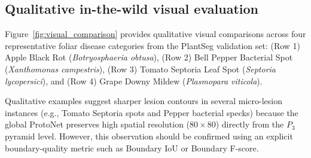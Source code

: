 \documentclass[5p,times]{elsarticle}
\begin{document}
\begin{table}[t]
\centering
\caption{Comprehensive quantitative benchmark across architectural tiers evaluated on the PlantSeg dataset (115 disease classes, 116 detector outputs). Latency and FPS measured on NVIDIA RTX 3070 Ti GPU ($640 \times 640$) and multi-core edge CPU ($320 \times 320$). Accuracy metrics measured on the unseen test partition ($N=2,295$ images, 15,569 lesion annotations) using pycocotools.}
\label{tab:hardware_benchmark}
\end{table}

\subsection{Qualitative in-the-wild visual evaluation}
Figure~\ref{fig:visual_comparison} provides qualitative visual comparisons across four representative foliar disease categories from the PlantSeg validation set: (Row 1) Apple Black Rot (\textit{Botryosphaeria obtusa}), (Row 2) Bell Pepper Bacterial Spot (\textit{Xanthomonas campestris}), (Row 3) Tomato Septoria Leaf Spot (\textit{Septoria lycopersici}), and (Row 4) Grape Downy Mildew (\textit{Plasmopara viticola}).

Qualitative examples suggest sharper lesion contours in several micro-lesion instances (e.g., Tomato Septoria spots and Pepper bacterial specks) because the global ProtoNet preserves high spatial resolution ($80 \times 80$) directly from the $P_3$ pyramid level. However, this observation should be confirmed using an explicit boundary-quality metric such as Boundary IoU or Boundary F-score.
\end{document}
